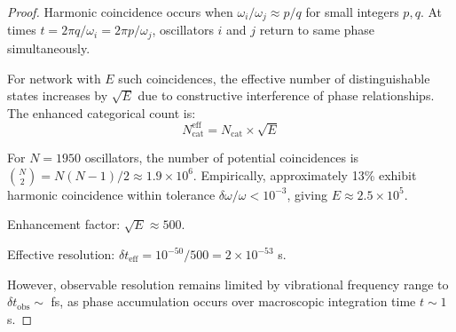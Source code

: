 \documentclass[twocolumn,10pt]{article}
\begin{document}
\begin{proof}
Harmonic coincidence occurs when $\omega_i/\omega_j \approx p/q$ for small integers $p, q$. At times $t = 2\pi q/\omega_i = 2\pi p/\omega_j$, oscillators $i$ and $j$ return to same phase simultaneously.

For network with $E$ such coincidences, the effective number of distinguishable states increases by $\sqrt{E}$ due to constructive interference of phase relationships. The enhanced categorical count is:
\begin{equation}
N_{\text{cat}}^{\text{eff}} = N_{\text{cat}} \times \sqrt{E}
\end{equation}

For $N = 1950$ oscillators, the number of potential coincidences is $\binom{N}{2} = N(N-1)/2 \approx 1.9 \times 10^6$. Empirically, approximately 13\% exhibit harmonic coincidence within tolerance $\delta\omega/\omega < 10^{-3}$, giving $E \approx 2.5 \times 10^5$.

Enhancement factor: $\sqrt{E} \approx 500$.

Effective resolution: $\delta t_{\text{eff}} = 10^{-50}/500 = 2 \times 10^{-53}$ s.

However, observable resolution remains limited by vibrational frequency range to $\delta t_{\text{obs}} \sim$ fs, as phase accumulation occurs over macroscopic integration time $t \sim 1$ s.
\end{proof}
\end{document}
